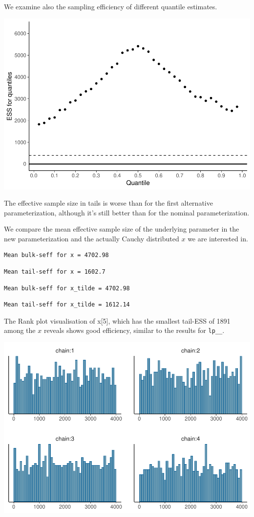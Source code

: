 \documentclass[american,]{article}
\begin{document}
We examine also the sampling efficiency of different quantile estimates.

\includegraphics{graphics/quantile-ess-fit-alt3-1.pdf}

The effective sample size in tails is worse than for the first
alternative parameterization, although it's still better than for the
nominal parameterization.

We compare the mean effective sample size of the underlying parameter in
the new parameterization and the actually Cauchy distributed \(x\) we
are interested in.

\begin{verbatim}
Mean bulk-seff for x = 4702.98
\end{verbatim}

\begin{verbatim}
Mean tail-seff for x = 1602.7
\end{verbatim}

\begin{verbatim}
Mean bulk-seff for x_tilde = 4702.98
\end{verbatim}

\begin{verbatim}
Mean tail-seff for x_tilde = 1612.14
\end{verbatim}

The Rank plot visualisation of x{[}5{]}, which has the smallest tail-ESS
of 1891 among the \(x\) reveals shows good efficiency, similar to the
results for \texttt{lp\_\_}.

\includegraphics{graphics/hist-fit-alt3-1.pdf}
\end{document}
